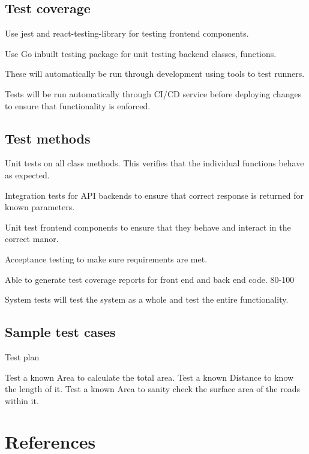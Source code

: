 \documentclass[a4paper,11pt]{article}
\begin{document}
\subsection{Test coverage}


Use jest and react-testing-library for testing frontend components.

Use Go inbuilt testing package for unit testing backend classes, functions.

These will automatically be run through development using tools to test runners.

Tests will be run automatically through CI/CD service before deploying changes to ensure that functionality is enforced.

\subsection{Test methods}


Unit tests on all class methods. This verifies that the individual functions behave as expected.

Integration tests for API backends to ensure that correct response is returned for known parameters.

Unit test frontend components to ensure that they behave and interact in the correct manor.

Acceptance testing to make sure requirements are met.

Able to generate test coverage reports for front end and back end code. 80-100%

System tests will test the system as a whole and test the entire functionality.


\subsection{Sample test cases}


Test plan

Test a known Area to calculate the total area.
Test a known Distance to know the length of it.
Test a known Area to sanity check the surface area of the roads within it.

\section{References}
\end{document}
